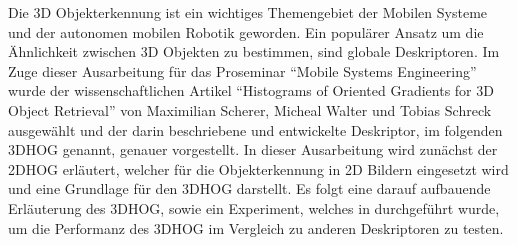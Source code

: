 Die 3D Objekterkennung ist ein wichtiges Themengebiet der Mobilen Systeme und der autonomen mobilen Robotik geworden.
Ein populärer Ansatz um die Ähnlichkeit zwischen 3D Objekten zu bestimmen, sind globale Deskriptoren. Im Zuge
dieser Ausarbeitung für das Proseminar "`Mobile Systems Engineering"' wurde der wissenschaftlichen Artikel 
"`Histograms of Oriented Gradients for 3D Object Retrieval"' von Maximilian Scherer, Micheal Walter und Tobias Schreck 
ausgewählt und der darin beschriebene und entwickelte Deskriptor, im folgenden 3DHOG genannt, genauer vorgestellt.
In dieser Ausarbeitung wird zunächst der 2DHOG erläutert, welcher für die Objekterkennung in 2D Bildern eingesetzt wird und eine Grundlage
für den 3DHOG darstellt. Es folgt eine darauf aufbauende Erläuterung des 3DHOG, sowie ein Experiment, welches in \cite{scherer2010histograms}
durchgeführt wurde, um die Performanz des 3DHOG im Vergleich zu anderen Deskriptoren zu testen.